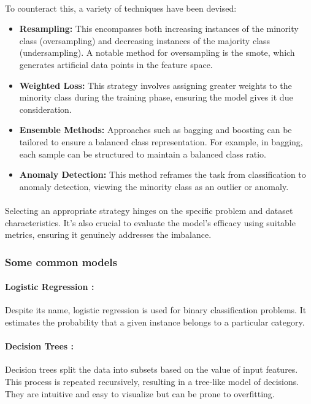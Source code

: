         \paragraph{}To counteract this, a variety of techniques have been devised:
        \begin{itemize}
        \item \textbf{Resampling:} This encompasses both increasing instances of the minority class (oversampling) and decreasing instances of the majority class (undersampling). A notable method for oversampling is the \acrfull{smote}, which generates artificial data points in the feature space.
        \item \textbf{Weighted Loss:} This strategy involves assigning greater weights to the minority class during the training phase, ensuring the model gives it due consideration.
        \item \textbf{Ensemble Methods:} Approaches such as bagging and boosting can be tailored to ensure a balanced class representation. For example, in bagging, each sample can be structured to maintain a balanced class ratio.
        \item \textbf{Anomaly Detection:} This method reframes the task from classification to anomaly detection, viewing the minority class as an outlier or anomaly.
        \end{itemize}
        \paragraph{}Selecting an appropriate strategy hinges on the specific problem and dataset characteristics. It's also crucial to evaluate the model's efficacy using suitable metrics, ensuring it genuinely addresses the imbalance.

    \subsubsection{Some common models}

        \paragraph{\textbf{Logistic Regression\cite{nick_logistic_2007} :}}
        Despite its name, logistic regression is used for binary classification problems. It estimates the probability that a given instance belongs to a particular category.
        
        \paragraph{\textbf{Decision Trees\cite{kotsiantis_decision_2013} :}}
        Decision trees split the data into subsets based on the value of input features. This process is repeated recursively, resulting in a tree-like model of decisions. They are intuitive and easy to visualize but can be prone to overfitting.
        

